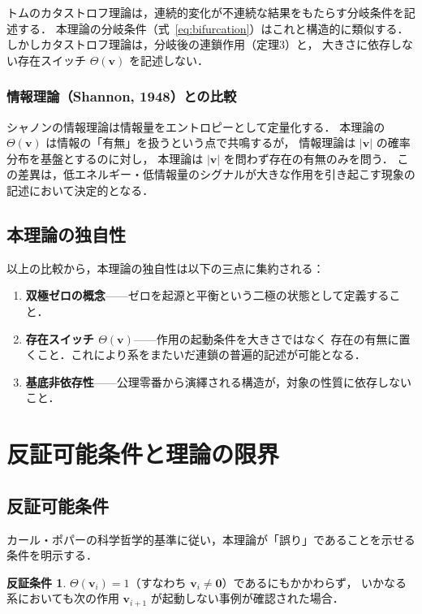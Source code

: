 \documentclass[12pt, a4paper]{article}
\theoremstyle{definition}
\newtheorem{condition}{反証条件}
\newcommand{\vzero}{\mathbf{0}}
\newcommand{\Switch}{\Theta}
\begin{document}
トムのカタストロフ理論は，連続的変化が不連続な結果をもたらす分岐条件を記述する．
本理論の分岐条件（式~\eqref{eq:bifurcation}）はこれと構造的に類似する．
しかしカタストロフ理論は，分岐後の連鎖作用（定理3）と，
大きさに依存しない存在スイッチ $\Switch(\mathbf{v})$ を記述しない．

\subsubsection{情報理論（Shannon, 1948）との比較}

シャノンの情報理論は情報量をエントロピーとして定量化する．
本理論の $\Switch(\mathbf{v})$ は情報の「有無」を扱うという点で共鳴するが，
情報理論は $|\mathbf{v}|$ の確率分布を基盤とするのに対し，
本理論は $|\mathbf{v}|$ を問わず存在の有無のみを問う．
この差異は，低エネルギー・低情報量のシグナルが大きな作用を引き起こす現象の
記述において決定的となる．

\subsection{本理論の独自性}

以上の比較から，本理論の独自性は以下の三点に集約される：

\begin{enumerate}
  \item \textbf{双極ゼロの概念}——ゼロを起源と平衡という二極の状態として定義すること．
  \item \textbf{存在スイッチ $\Switch(\mathbf{v})$}——作用の起動条件を大きさではなく
        存在の有無に置くこと．これにより系をまたいだ連鎖の普遍的記述が可能となる．
  \item \textbf{基底非依存性}——公理零番から演繹される構造が，対象の性質に依存しないこと．
\end{enumerate}

\section{反証可能条件と理論の限界}

\subsection{反証可能条件}

カール・ポパーの科学哲学的基準に従い，本理論が「誤り」であることを示せる条件を明示する．

\begin{condition}
  $\Switch(\mathbf{v}_i) = 1$（すなわち $\mathbf{v}_i \neq \vzero$）であるにもかかわらず，
  いかなる系においても次の作用 $\mathbf{v}_{i+1}$ が起動しない事例が確認された場合．
\end{condition}
\end{document}
